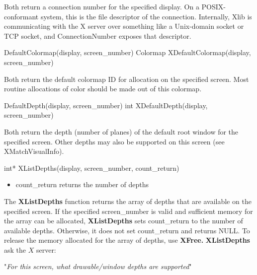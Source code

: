 \documentclass{report}
\begin{document}
\begin{itemize}
\begin{cppcode}
            \end{cppcode}
            \bigbreak \noindent 
            Both return a connection number for the specified display. On a POSIX-conformant system, this is the file descriptor of the connection.
            \bigbreak \noindent 
            Internally, Xlib is communicating with the X server over something like a Unix-domain socket or TCP socket, and ConnectionNumber exposes that descriptor.
            \bigbreak \noindent 
            \begin{cppcode}
            DefaultColormap(display, screen_number)
            Colormap XDefaultColormap(display, screen_number)
            \end{cppcode}
            \bigbreak \noindent 
            Both return the default colormap ID for allocation on the specified screen. Most routine allocations of color should be made out of this colormap.
            \bigbreak \noindent 
            \begin{cppcode}
            DefaultDepth(display, screen_number)
            int XDefaultDepth(display, screen_number)
            \end{cppcode}
            \bigbreak \noindent 
            Both return the depth (number of planes) of the default root window for the speciﬁed screen. Other depths may also be supported on this screen (see XMatchVisualInfo).
            \bigbreak \noindent 
            \begin{cppcode}
            int* XListDepths(display, screen_number, count_return)
            \end{cppcode}
            \begin{itemize}
                \item count\_return returns the number of depths
            \end{itemize}
            The \textbf{XListDepths}  function returns the array of depths that are available on the specified screen. If the specified screen\_number is valid and sufficient memory for the array can be allocated, \textbf{XListDepths} sets count\_return to the number of available depths. Otherwise, it does not set count\_return and returns NULL. To release the memory allocated for the array of depths, use \textbf{XFree.}
            \bigbreak \noindent 
            \textbf{XListDepths} ask the $X$ server:
            \begin{center}
                "\textit{For this screen, what drawable/window depths are supported}"
            \end{center}

\end{itemize}
\end{document}
